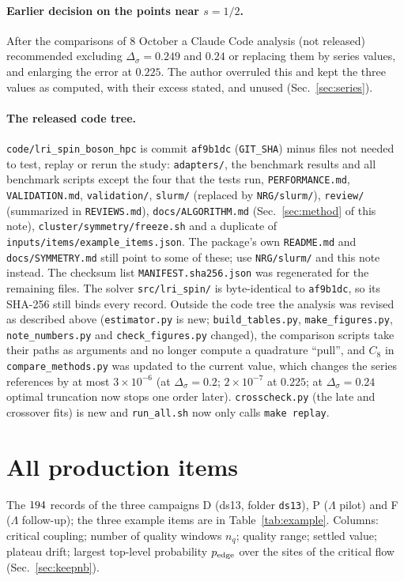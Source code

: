 \documentclass[10pt,a4paper]{article}
\newcommand{\Ds}{\Delta_\sigma}
\newcommand{\code}[1]{\texttt{#1}}
\newcommand{\nq}{n_q}
\begin{document}
\paragraph{Earlier decision on the points near $s=1/2$.} After the comparisons of 8 October a Claude Code analysis (not released)
recommended excluding $\Ds=0.249$ and $0.24$ or replacing them by series values, and enlarging the error at $0.225$. The author
overruled this and kept the three values as computed, with their excess stated, and unused (Sec.~\ref{sec:series}).

\paragraph{The released code tree.} \code{code/lri\_spin\_boson\_hpc} is commit \code{af9b1dc} (\code{GIT\_SHA}) minus files not
needed to test, replay or rerun the study: \code{adapters/}, the benchmark results and all benchmark scripts except the four that
the tests run, \code{PERFORMANCE.md}, \code{VALIDATION.md}, \code{validation/}, \code{slurm/} (replaced by \code{NRG/slurm/}),
\code{review/} (summarized in \code{REVIEWS.md}), \code{docs/ALGORITHM.md} (Sec.~\ref{sec:method} of this note),
\code{cluster/symmetry/freeze.sh} and a duplicate of \code{inputs/items/example\_items.json}. The package's own \code{README.md} and
\code{docs/SYMMETRY.md} still point to some of these; use \code{NRG/slurm/} and this note instead. The checksum list
\code{MANIFEST.sha256.json} was regenerated for the remaining files. The solver \code{src/lri\_spin/} is byte-identical to
\code{af9b1dc}, so its SHA-256 still binds every record. Outside the code tree the analysis was revised as described above
(\code{estimator.py} is new; \code{build\_tables.py}, \code{make\_figures.py}, \code{note\_numbers.py} and \code{check\_figures.py}
changed), the comparison scripts take their paths as arguments and no longer compute a quadrature ``pull'', and $C_8$ in
\code{compare\_methods.py} was updated to the current value, which changes the series references by at most $3\times10^{-6}$ (at
$\Ds=0.2$; $2\times10^{-7}$ at $0.225$; at $\Ds=0.24$ optimal truncation now stops one order later). \code{crosscheck.py} (the
late and crossover fits) is new and \code{run\_all.sh} now only calls \code{make replay}.

\section{All production items}\label{app:items}
The $194$ records of the three campaigns D (ds13, folder \code{ds13}), P ($\Lambda$ pilot) and F
($\Lambda$ follow-up); the three example items are in Table~\ref{tab:example}. Columns: critical coupling; number of quality windows
$\nq$; quality range; settled value; plateau drift; largest top-level probability $p_{\rm edge}$ over the sites of the critical flow
(Sec.~\ref{sec:keepnb}).
\begingroup\scriptsize\setlength{\tabcolsep}{3pt}

\endgroup
\end{document}
